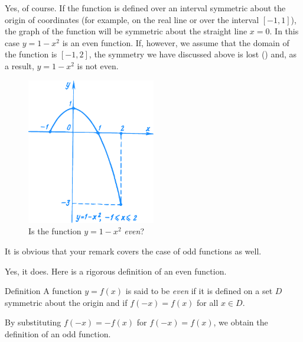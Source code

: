 {\athr Yes, of course. If the function is defined over an interval symmetric about the origin of coordinates (for example, on the real line or over the interval $[-1, 1]$), the graph of the function will be symmetric about the straight line $x= 0$. In this case $y= 1- x^{2}$ is an even function. If, however, we assume that the domain of the function is $[-1, 2]$, the symmetry we have discussed above is lost () and, as a result, $y = 1 - x^{2}$ is not even.
\begin{figure}[!ht]%
\centering
\includegraphics[width=0.5\textwidth,angle=1]{figures/fig-17.pdf}
\caption{ Is the function $y = 1 - x^{2}$  \emph{even}?}
\label{fig-17}
\end{figure}


\rdr It is obvious that your remark covers the case of odd functions as well.

\athr Yes, it does. Here is a rigorous definition of an even function.
\begin{mytheo}{Definition}
A function $y= f (x)$ is said to be \emph{even} if it is defined on a set $D$ symmetric about the origin and if $f (-x) = f (x)$ for all $x \in D$.
\end{mytheo}
By substituting $f (-x) = -f(x)$ for $f (-x) = f (x)$, we obtain the definition of an odd function.

}
